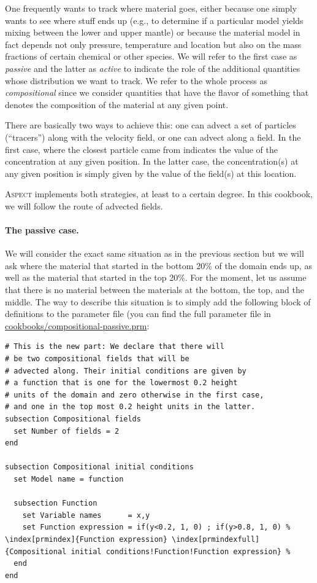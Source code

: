 \documentclass{article}
\newcommand{\aspect}{\textsc{Aspect}}
\begin{document}
One frequently wants to track where material goes, either because one simply
wants to see where stuff ends up (e.g., to determine if a particular model
yields mixing between the lower and upper mantle) or because the material model
in fact depends not only pressure, temperature and location but also on the
mass fractions of certain chemical or other species. We will refer to the first
case as \textit{passive} and the latter as \textit{active} to indicate the role
of the additional quantities whose distribution we want to track. We refer to
the whole process as \textit{compositional} since we consider quantities that
have the flavor of something that denotes the composition of the material at any
given point.

There are basically two ways to achieve this: one can advect a set of
particles (``tracers'') along with the velocity field, or one can advect along a
field. In the first case, where the closest particle came from indicates the
value of the concentration at any given position. In the latter case, the
concentration(s) at any given position is simply given by the value of the
field(s) at this location.

\aspect{} implements both strategies, at least to a certain degree. In this
cookbook, we will follow the route of advected fields.

\paragraph{The passive case.}
We will consider the
exact same situation as in the previous section but we will ask where the
material that started in the bottom 20\% of the domain
ends up, as well as the material that started in the top 20\%. For the moment,
let us assume that there is no material between the materials at the bottom, the
top, and the middle. The way to describe this situation is to simply add the
following block of definitions to the parameter file (you can find the full
parameter file in \url{cookbooks/compositional-passive.prm}:

\begin{lstlisting}[frame=single,language=prmfile,escapechar=\%]
# This is the new part: We declare that there will
# be two compositional fields that will be
# advected along. Their initial conditions are given by
# a function that is one for the lowermost 0.2 height
# units of the domain and zero otherwise in the first case,
# and one in the top most 0.2 height units in the latter.
subsection Compositional fields
  set Number of fields = 2
end

subsection Compositional initial conditions
  set Model name = function

  subsection Function
    set Variable names      = x,y
    set Function expression = if(y<0.2, 1, 0) ; if(y>0.8, 1, 0) % \index[prmindex]{Function expression} \index[prmindexfull]{Compositional initial conditions!Function!Function expression} %
  end
end
\end{lstlisting}
\end{document}
